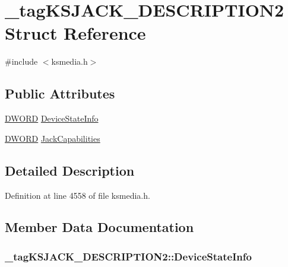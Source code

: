 \hypertarget{struct__tag_k_s_j_a_c_k___d_e_s_c_r_i_p_t_i_o_n2}{}\section{\+\_\+tag\+K\+S\+J\+A\+C\+K\+\_\+\+D\+E\+S\+C\+R\+I\+P\+T\+I\+O\+N2 Struct Reference}
\label{struct__tag_k_s_j_a_c_k___d_e_s_c_r_i_p_t_i_o_n2}


{\ttfamily \#include $<$ksmedia.\+h$>$}

\subsection*{Public Attributes}
\begin{DoxyCompactItemize}
\item 
\hyperlink{mapinls_8h_ad342ac907eb044443153a22f964bf0af}{D\+W\+O\+RD} \hyperlink{struct__tag_k_s_j_a_c_k___d_e_s_c_r_i_p_t_i_o_n2_af293d7d7d28d181802ce92fef9ffdd45}{Device\+State\+Info}
\item 
\hyperlink{mapinls_8h_ad342ac907eb044443153a22f964bf0af}{D\+W\+O\+RD} \hyperlink{struct__tag_k_s_j_a_c_k___d_e_s_c_r_i_p_t_i_o_n2_a43c3043182b781835617f8bf666e7250}{Jack\+Capabilities}
\end{DoxyCompactItemize}


\subsection{Detailed Description}


Definition at line 4558 of file ksmedia.\+h.



\subsection{Member Data Documentation}
\subsubsection[{\texorpdfstring{Device\+State\+Info}{DeviceStateInfo}}]{ \+\_\+tag\+K\+S\+J\+A\+C\+K\+\_\+\+D\+E\+S\+C\+R\+I\+P\+T\+I\+O\+N2\+::\+Device\+State\+Info}\hypertarget{struct__tag_k_s_j_a_c_k___d_e_s_c_r_i_p_t_i_o_n2_af293d7d7d28d181802ce92fef9ffdd45}{}\label{struct__tag_k_s_j_a_c_k___d_e_s_c_r_i_p_t_i_o_n2_af293d7d7d28d181802ce92fef9ffdd45}


